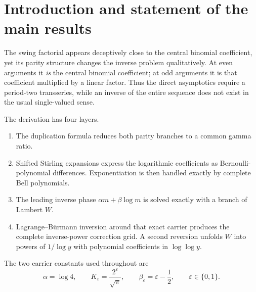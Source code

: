 \documentclass[11pt,a4paper]{article}
\theoremstyle{clean}
\theoremstyle{definition}
\newcommand{\eps}{\varepsilon}
\newcommand{\al}{\alpha}
\newcommand{\be}{\beta}
\begin{document}
\tableofcontents
\newpage

\section{Introduction and statement of the main results}
\label{sec:intro}

The swing factorial appears deceptively close to the central binomial coefficient, yet its parity structure changes the inverse problem qualitatively.  At even arguments it \emph{is} the central binomial coefficient; at odd arguments it is that coefficient multiplied by a linear factor.  Thus the direct asymptotics require a period-two transseries, while an inverse of the entire sequence does not exist in the usual single-valued sense.

The derivation has four layers.
\begin{enumerate}
\item The duplication formula reduces both parity branches to a common gamma ratio.
\item Shifted Stirling expansions express the logarithmic coefficients as Bernoulli-polynomial differences.  Exponentiation is then handled exactly by complete Bell polynomials.
\item The leading inverse phase \(\al m+\be\log m\) is solved exactly with a branch of Lambert \(W\).
\item Lagrange--B\"urmann inversion around that exact carrier produces the complete inverse-power correction grid.  A second reversion unfolds \(W\) into powers of \(1/\log y\) with polynomial coefficients in \(\log\log y\).
\end{enumerate}

The two carrier constants used throughout are
\begin{equation}
  \al=\log4,\qquad
  K_\eps=\frac{2^\eps}{\sqrt\pi},\qquad
  \be_\eps=\eps-\frac12,
  \qquad \eps\in\{0,1\}.
  \label{eq:carrier-constants}
\end{equation}
\end{document}
